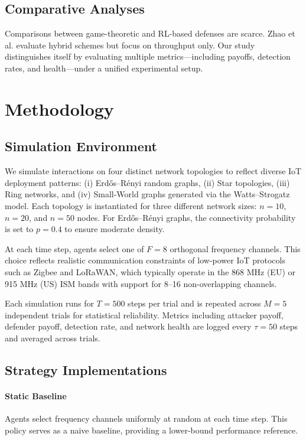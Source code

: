 \documentclass[conference]{IEEEtran}
\begin{document}
\subsection{Comparative Analyses}
Comparisons between game-theoretic and RL-based defenses are scarce. Zhao et al. \cite{zhao2020hybrid} evaluate hybrid schemes but focus on throughput only. Our study distinguishes itself by evaluating multiple metrics—including payoffs, detection rates, and health—under a unified experimental setup.

\section{Methodology}
\subsection{Simulation Environment}
We simulate interactions on four distinct network topologies to reflect diverse IoT deployment patterns: (i) Erd\H{o}s--R\'enyi random graphs, (ii) Star topologies, (iii) Ring networks, and (iv) Small-World graphs generated via the Watts–Strogatz model. Each topology is instantiated for three different network sizes: $n = 10$, $n = 20$, and $n = 50$ nodes. For Erd\H{o}s--R\'enyi graphs, the connectivity probability is set to $p=0.4$ to ensure moderate density.

At each time step, agents select one of $F=8$ orthogonal frequency channels. This choice reflects realistic communication constraints of low-power IoT protocols such as Zigbee and LoRaWAN, which typically operate in the 868 MHz (EU) or 915 MHz (US) ISM bands with support for 8–16 non-overlapping channels.

Each simulation runs for $T=500$ steps per trial and is repeated across $M=5$ independent trials for statistical reliability. Metrics including attacker payoff, defender payoff, detection rate, and network health are logged every $\tau = 50$ steps and averaged across trials.

\subsection{Strategy Implementations}
\paragraph{Static Baseline} Agents select frequency channels uniformly at random at each time step. This policy serves as a naive baseline, providing a lower-bound performance reference.
\end{document}
